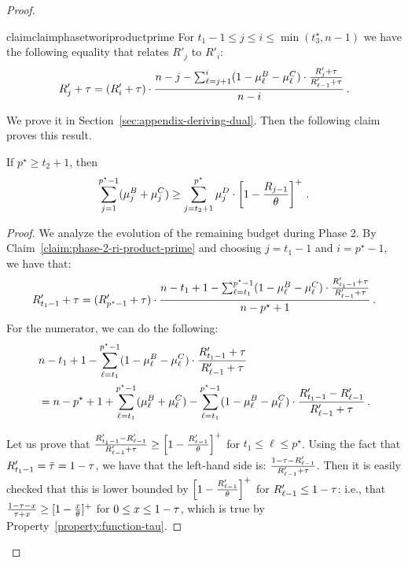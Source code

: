 \begin{proof}
    \begin{restatable}{claim}{claimphasetworiproductprime}\label{claim:phase-2-ri-product-prime}
    For $t_1 - 1\leq j\leq i \leq \min(t_3^\star, n - 1)$ we have the following equality that relates $R'_j$ to $R'_i$:
    \begin{equation*}
        R'_j+\tau = (R'_i + \tau) \cdot \frac{n-j - \sum_{\ell=j+1}^i (1- \mu_{\ell}^B - \mu_{\ell}^C) \cdot \frac{R'_j+\tau}{R'_{\ell-1}+\tau}}{n-i}\,.
    \end{equation*}
    \end{restatable}
    We prove it in Section~\ref{sec:appendix-deriving-dual}.
    Then the following claim proves this result.
    \begin{claim}\label{clm:b-size2}
    If $p^\star \geq t_2 + 1$, then
    \[\sum_{j=1}^{p^\star - 1} (\mu_j^B+\mu_j^C) \geq \sum_{j=t_2+1}^{p^\star} \mu_j^D \cdot\left[1 -\frac{R_{j-1}}{\theta}\right]^+\,.\]
    \end{claim}
    \begin{proof}
        We analyze the evolution of the remaining budget during Phase 2.
        By Claim~\ref{claim:phase-2-ri-product-prime} and choosing $j=t_1 - 1$ and $i=p^\star - 1$, we have that:
        \begin{equation*}
            R'_{t_1 - 1} + \tau = (R'_{p^\star - 1} + \tau) \cdot \frac{n-t_1+1-\sum_{\ell=t_1}^{p^\star - 1} (1-\mu_{\ell}^B-\mu_{\ell}^C) \cdot \frac{R'_{t_1-1}+\tau}{R'_{\ell-1}+\tau}}{n-p^\star+1}\,.
        \end{equation*}
        For the numerator, we can do the following:
        \begin{align*}
            &n-t_1+1-\sum_{\ell=t_1}^{p^\star-1} (1-\mu_{\ell}^B-\mu_{\ell}^C) \cdot \frac{R'_{t_1-1}+\tau}{R'_{\ell-1}+\tau}\\
            &= n-p^\star+1 + \sum_{\ell=t_1}^{p^\star-1}(\mu_{\ell}^B+\mu_{\ell}^C)-\sum_{\ell=t_1}^{p^\star-1} (1-\mu_{\ell}^B-\mu_{\ell}^C) \cdot \frac{R'_{t_1-1}-R'_{\ell-1}}{R'_{\ell-1}+\tau}\,.
        \end{align*}
        
        Let us prove that $\frac{R'_{t_1 - 1}-R'_{\ell-1}}{R'_{\ell-1}+\tau} \geq \left[1-\frac{R'_{\ell-1}}{\theta}\right]^+$ for $t_1 \leq \ell\leq p^\star$. Using the fact that $R'_{t_1 - 1}=\bar\tau=1-\tau$, we have that the left-hand side is: $\frac{1-\tau-R'_{\ell-1}}{R'_{\ell-1}+\tau}$. Then it is easily checked that this is lower bounded by $\left[1-\frac{R'_{\ell-1}}{\theta}\right]^+$ for $R'_{\ell - 1} \leq 1-\tau$: i.e., that $\frac{1-\tau-x}{\tau+x} \geq [1-\frac{x}{\theta}]^+$ for $0 \leq x \leq 1-\tau$, which is true by Property~\ref{property:function-tau}.
        

\end{proof}
\end{proof}
